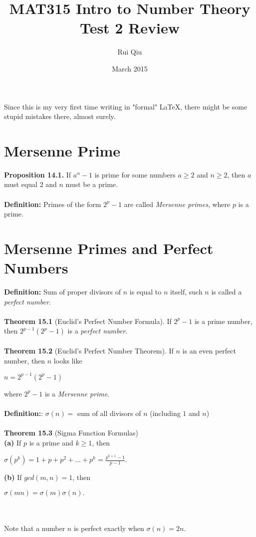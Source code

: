\documentclass{article}
\title{MAT315 Intro to Number Theory Test 2 Review}
\author{Rui Qiu}
\date{March 2015}
\newenvironment{nscenter}
 {\parskip=0pt\par\nopagebreak\centering}
 {\par\noindent\ignorespacesafterend}
\begin{document}
\maketitle

Since this is my very first time writing in "formal" \LaTeX, there might be some stupid mistakes there, almost surely.

\section{Mersenne Prime}

{\bf Proposition 14.1.} If $a^n - 1$ is prime for some numbers $a \geqslant 2$ and $n \geqslant 2$, then $a$ must equal $2$ and $n$ must be a prime. \\\\
{\bf Definition:} Primes of the form $2^p - 1$ are called {\it Mersenne primes}, where $p$ is a prime.

\section{Mersenne Primes and Perfect Numbers}

{\bf Definition:} Sum of proper divisors of $n$ is equal to $n$ itself, such $n$ is called a {\it perfect number}. \\\\
{\bf Theorem 15.1} (Euclid's Perfect Number Formula). If $2^p -1$ is a prime number, then $2^{p-1}(2^p-1)$ is a {\it perfect number}. \\\\
{\bf Theorem 15.2} (Euclid's Perfect Number Theorem). If $n$ is an even perfect number, then $n$ looks like
\begin{nscenter}
\bfseries $n=2^{p-1}(2^p-1)$
\end{nscenter}
where $2^p-1$ is a {\it Mersenne prime}. \\\\
{\bf Definition:}: $\sigma(n) =$ sum of all divisors of $n$ (including $1$ and $n$)\\\\
{\bf Theorem 15.3} (Sigma Function Formulas) \\
{\bf (a)} If $p$ is a prime and $k \geqslant 1$, then 
\begin{nscenter}
\bfseries $\sigma(p^k) = 1 + p + p^2 + ... + p^k = \frac{p^{k+1}-1}{p-1}.$
\end{nscenter}
{\bf (b)} If $gcd(m, n) = 1$, then
\begin{nscenter}
\bfseries $\sigma(mn) = \sigma(m)\sigma(n).$
\end{nscenter}\\\\
Note that a number $n$ is perfect exactly when $\sigma(n)=2n$.
\end{document}
